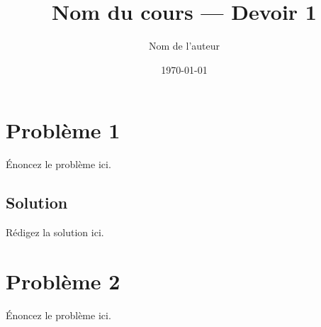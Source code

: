 \documentclass[11pt]{article}
\title{Nom du cours — Devoir 1}
\author{Nom de l'auteur}
\date{\today}
\begin{document}
\maketitle

\section*{Problème 1}
Énoncez le problème ici.

\subsection*{Solution}
Rédigez la solution ici.

\section*{Problème 2}
Énoncez le problème ici.
\end{document}
